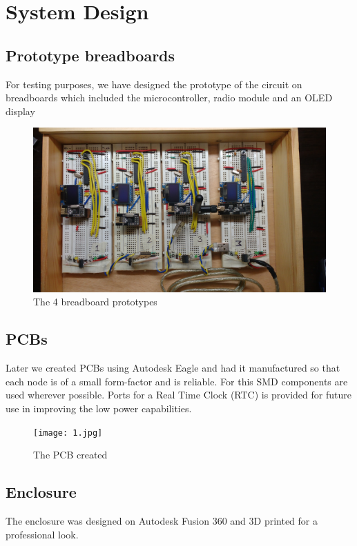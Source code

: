 \documentclass[journal]{IEEEtran}
\begin{document}
\section{System Design}
\subsection{Prototype breadboards}
For testing purposes, we have designed the prototype of the circuit on breadboards which included the microcontroller, radio module and an OLED display

\begin{figure}[ht]
	\centering
	\includegraphics[scale=0.06]{all_breadboards.jpg}
	\caption{The 4 breadboard prototypes}
	\label{fig_sim}
\end{figure}

\subsection{PCBs}
Later we created PCBs using Autodesk Eagle and had it manufactured so that each node is of a small form-factor and is reliable. For this SMD components are used wherever possible. Ports for a Real Time Clock (RTC) is provided for future use in improving the low power capabilities.

\begin{figure}[ht]
	\centering
	\texttt{[image: 1.jpg]}
	\caption{The PCB created}
	\label{fig_sim}
\end{figure}

\subsection{Enclosure}
The enclosure was designed on Autodesk Fusion 360 and 3D printed for a professional look.
\end{document}
